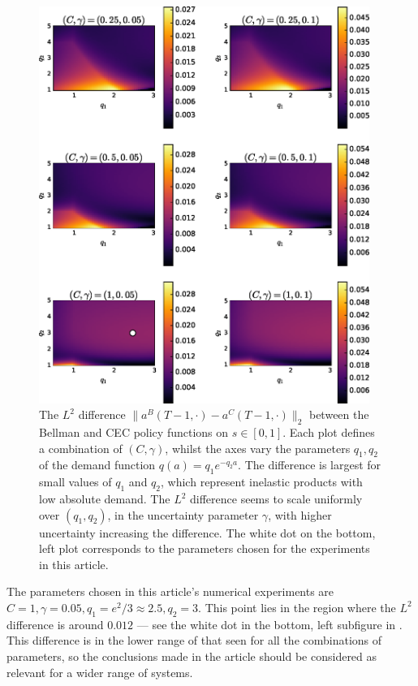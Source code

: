 \documentclass[main.tex]{subfiles}
\begin{document}
\begin{figure}[htbp]
    \includegraphics[width=0.96\textwidth]{./img/policy_diff_heatmaps}
  \caption{The $L^2$ difference $\|a^B(T-1,\cdot)-a^C(T-1,\cdot)\|_2$
    between the Bellman and CEC policy functions on $s\in[0,1]$.
    Each plot defines a combination of $(C,\gamma)$, whilst
    the axes vary the parameters $q_1,q_2$ of the demand function
    $q(a)=q_1e^{-q_2a}$.
    The difference is largest for small values of $q_1$ and $q_2$,
    which represent inelastic products with low absolute demand.
    The $L^2$ difference seems to scale uniformly over $(q_1,q_2)$, in the uncertainty
    parameter $\gamma$, with higher uncertainty increasing the
    difference.
    The white dot on the bottom, left plot corresponds to the
    parameters chosen for the experiments in this article.
  }\label{fig:policy_diff_heatmaps}
\end{figure}

The parameters chosen in this article's numerical experiments
are $C=1,\gamma=0.05,q_1=e^2/3\approx2.5,q_2=3$. This point lies
in the region where the $L^2$ difference is around $0.012$ --- see the
white dot in the
bottom, left subfigure in .
This difference is in the lower range of that seen for all the
combinations of parameters, so the conclusions made in the article
should be considered as relevant for a wider range of systems.

\biblio
\end{document}
